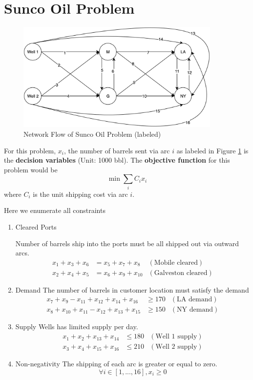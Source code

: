 \section{Sunco Oil Problem}\label{prob2}

\begin{figure}[h]
    \centering
    \includegraphics[width=0.9\textwidth]{hw1/hw1-prob2-graph.png}
    \caption{Network Flow of Sunco Oil Problem (labeled)}
    \label{fig:sunco_nodes}
\end{figure}

For this problem, $x_i$, the number of barrels sent via arc $i$ as labeled in Figure \ref{fig:sunco_nodes} is the \textbf{decision variables} (Unit: 1000 bbl). The \textbf{objective function} for this problem would be 
$$
\min \sum_i C_i x_i
$$
where $C_i$ is the unit shipping cost via arc $i$. 

Here we enumerate all constraints
\begin{enumerate}
\item Cleared Ports\par
Number of barrels ship into the ports must be all shipped out via outward arcs.
\begin{align*}
x_1 + x_3 + x_6 &= x_5 + x_7 + x_8 &(\text{Mobile cleared})\\
x_2 + x_4 + x_5 &= x_6 + x_9 + x_{10} &(\text{Galveston cleared})
\end{align*}

\item Demand
The number of barrels in customer location must satisfy the demand
\begin{align*}
x_7 + x_9 - x_{11} + x_{12} + x_{14} + x_{16} &\geq 170 &(\text{LA demand})\\
x_8 + x_{10} + x_{11} - x_{12} + x_{13} + x_{15} &\geq 150 &(\text{NY demand}) 
\end{align*}

\item Supply
Wells has limited supply per day. 
\begin{align*}
x_1 + x_2 + x_{13} + x_{14} &\leq 180 &(\text{Well 1 supply})\\
x_3 + x_4 + x_{15} + x_{16} &\leq 210 &(\text{Well 2 supply})
\end{align*}

\item Non-negativity
The shipping of each arc is greater or equal to zero.
$$
\forall i \in [1,...,16], x_i \geq 0
$$

\end{enumerate}

